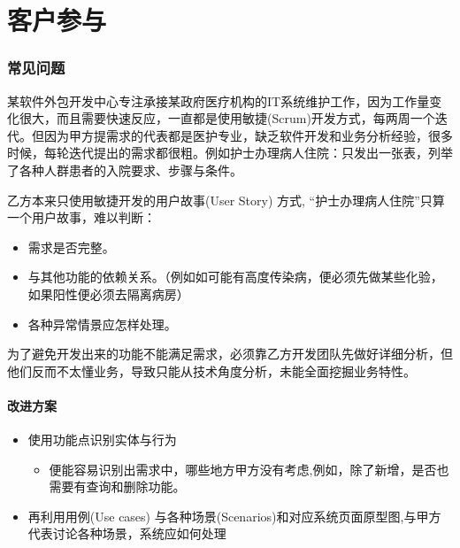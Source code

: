 \chapter{客户参与} %

\hypertarget{ux5e38ux89c1ux95eeux9898}{%
\subsection{常见问题}\label{ux5e38ux89c1ux95eeux9898}}

某软件外包开发中心专注承接某政府医疗机构的IT系统维护工作，因为工作量变化很大，而且需要快速反应，一直都是使用敏捷(Scrum)开发方式，每两周一个迭代。但因为甲方提需求的代表都是医护专业，缺乏软件开发和业务分析经验，很多时候，每轮迭代提出的需求都很粗。例如护士办理病人住院：只发出一张表，列举了各种人群患者的入院要求、步骤与条件。 

乙方本来只使用敏捷开发的用户故事(User Story) 方式,
``护士办理病人住院''只算一个用户故事，难以判断：

\begin{itemize}
\tightlist
\item
  需求是否完整。
\item
  与其他功能的依赖关系。（例如如可能有高度传染病，便必须先做某些化验，如果阳性便必须去隔离病房）
\item
  各种异常情景应怎样处理。
\end{itemize}

为了避免开发出来的功能不能满足需求，必须靠乙方开发团队先做好详细分析，但他们反而不太懂业务，导致只能从技术角度分析，未能全面挖掘业务特性。

\hypertarget{ux6539ux8fdbux65b9ux6848}{%
\subsubsection{改进方案}\label{ux6539ux8fdbux65b9ux6848}}

\begin{itemize}
\tightlist
\item
  使用功能点识别实体与行为

  \begin{itemize}
  \tightlist
  \item
    便能容易识别出需求中，哪些地方甲方没有考虑,例如，除了新增，是否也需要有查询和删除功能。
  \end{itemize}
\item
  再利用用例(Use cases)
  与各种场景(Scenarios)和对应系统页面原型图,与甲方代表讨论各种场景，系统应如何处理
\end{itemize}

